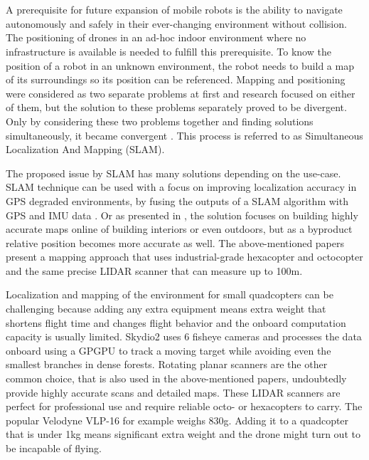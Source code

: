 \chapter{\bevezetes}





A prerequisite for future expansion of mobile robots is the ability to navigate autonomously and safely in their ever-changing
environment without collision. The positioning of drones in an ad-hoc indoor environment where no infrastructure is available is
needed to fulfill this prerequisite. To know the position of a robot in an unknown environment, the robot needs to build a map
of its surroundings so its position can be referenced. Mapping and positioning were considered as two separate problems 
at first and research focused on either of them, but the solution to these problems separately proved to be divergent. Only 
by considering these two problems together and finding solutions simultaneously, it became convergent 
\cite{durrant2006simultaneous}. This process is referred to as Simultaneous Localization And Mapping (SLAM).

The proposed issue by SLAM has many solutions depending on the use-case. SLAM technique can be used with a 
focus on improving localization accuracy in GPS degraded environments, by fusing the outputs of a SLAM algorithm with GPS and
IMU data \cite{hening20173d}. Or as presented in \cite{droeschel2018efficient}, the solution focuses on building highly accurate maps
online of building interiors or even outdoors, but as a byproduct relative position becomes more accurate as well. The 
above-mentioned papers present a mapping approach that uses industrial-grade hexacopter and octocopter and the same 
precise LIDAR scanner that can measure up to 100m. 

Localization and mapping of the environment for small quadcopters can be challenging because adding any extra equipment means
extra weight that shortens flight time and changes flight behavior and the onboard computation capacity is usually limited. 
Skydio2 \cite{SkydioWebsite} uses 6 fisheye cameras and processes the data onboard using a GPGPU to track a moving target
while avoiding even the smallest branches in dense forests.
Rotating planar scanners are the other common choice, that is also used in the above-mentioned papers, undoubtedly 
provide highly accurate scans and detailed maps. These LIDAR scanners are perfect for professional use and require reliable
octo- or hexacopters to carry. The popular Velodyne VLP-16 for example weighs 830g. Adding it to a quadcopter that is under 
1kg means significant extra weight and the drone might turn out to be incapable of flying. 

